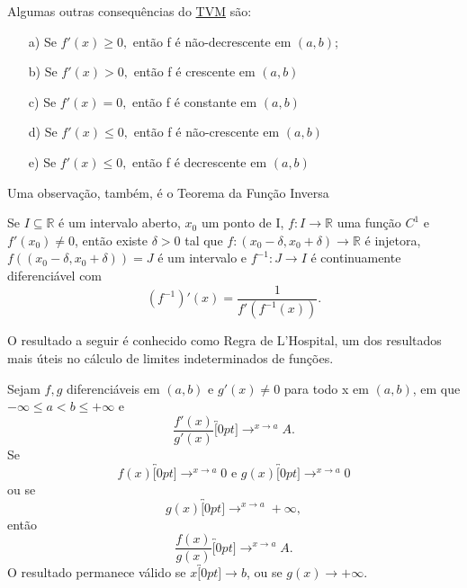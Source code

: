 \documentclass[Analysis/analysis_notes.tex]{subfiles}
\begin{document}
Algumas outras consequências do \hyperlink{mean_value}{TVM} são:
\begin{crl*}
	\begin{itemize}
		\item[a)] Se \(f'(x)\geq  0,\) então f é não-decrescente em \((a, b)\);
		\item[b)] Se \(f'(x) > 0,\) então f é crescente em \((a, b)\)
		\item[c)]  Se \(f'(x) = 0,\) então f é constante em \((a, b)\)
		\item[d)] Se \(f'(x)\leq  0,\) então f é não-crescente em \((a, b)\)
		\item[e)] Se \(f'(x)\leq  0,\) então f é decrescente em \((a, b)\)
	\end{itemize}
\end{crl*}
Uma observa\c cão, também, é o Teorema da Fun\c cão Inversa
\begin{theorem*}
	Se \(I\subseteq{\mathbb{R}}\) é um intervalo aberto, \(x_{0}\) um ponto de I,
	\(f:I\rightarrow \mathbb{R}\) uma fun\c cão \(C^{1}\) e \(f'(x_{0})\neq 0\), então
	existe \(\delta >0\) tal que \(f:(x_{0}-\delta, x_{0}+\delta )\rightarrow \mathbb{R}\)
	é injetora, \(f((x_{0}-\delta ,x_{0}+\delta )) = J\) é um intervalo e \(f^{-1}:J\rightarrow I\)
	é continuamente diferenciável com
	\[
		(f^{-1})'(x) = \frac{1}{f'(f^{-1}(x))}.
	\]
\end{theorem*}
O resultado a seguir é conhecido como Regra de L'Hospital, um dos resultados
mais úteis no cálculo de limites indeterminados de fun\c cões.
\hypertarget{Lhospital}{
	\begin{theorem*}
		Sejam \(f, g\) diferenciáveis em \((a, b)\) e \(g'(x)\neq0\) para todo
		x em \((a, b)\), em que \(-\infty\leq a < b\leq +\infty\) e
		\[
			\frac{f'(x)}{g'(x)}\overbracket[0pt]{\longrightarrow}^{x\to a}A.
		\]
		Se
		\[
			f(x)\overbracket[0pt]{\longrightarrow}^{x\to a}0\text{ e }g(x)\overbracket[0pt]{\longrightarrow}^{x\to a}0
		\]
		ou se
		\[
			g(x)\overbracket[0pt]{\longrightarrow}^{x\to a}+\infty,
		\]
		então
		\[
			\frac{f(x)}{g(x)}\overbracket[0pt]{\longrightarrow}^{x\to a}A.
		\]
		O resultado permanece válido se \(x\overbracket[0pt]{\longrightarrow}b\), ou se
		\(g(x)\longrightarrow+\infty.\)
	\end{theorem*}
}
\end{document}
